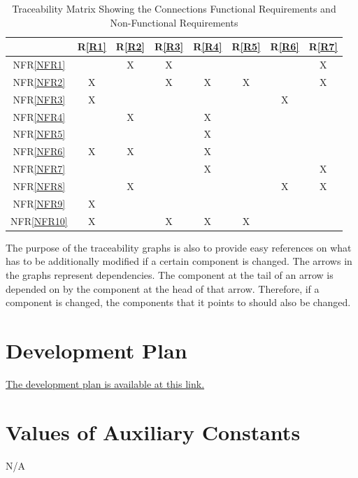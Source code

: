 \documentclass[12pt]{article}
\newcommand{\frref}[1]{R\ref{#1}}
\newcommand{\nfrref}[1]{NFR\ref{#1}}
\begin{document}
\begin{table}[H]
	\centering
	\caption{Traceability Matrix Showing the Connections Functional Requirements and Non-Functional Requirements}
	\begin{tabular}{|c|c|c|c|c|c|c|c|}
	\hline
		& \frref{R1}& \frref{R2}& \frref{R3}& \frref{R4}& \frref{R5}& \frref{R6}& \frref{R7} \\
	\hline                    %
	\nfrref{NFR1}         &   & X& X&   &   &   & X\\ \hline
	\nfrref{NFR2}         & X&   & X& X&  X&   & X\\ \hline
	\nfrref{NFR3}         & X&   &   &   &   & X&   \\ \hline
	\nfrref{NFR4}         &   & X&   & X&   &   &   \\ \hline
	\nfrref{NFR5}         &   &   &   &  X &   &   &   \\ \hline
	\nfrref{NFR6}         &  X &  X &   &  X &   &   &   \\ \hline
	\nfrref{NFR7}         &   &   &   & X  &   &   &X   \\ \hline
	\nfrref{NFR8}         &   &   X&   &   &   & X  &X   \\ \hline
	\nfrref{NFR9}         &   X&   &   &   &   &   &   \\ \hline 
	\nfrref{NFR10}       &  X &   & X  & X  & X  &   &   \\ 
	\hline
	\end{tabular}
	\label{Table:R_trace}
\end{table}

The purpose of the traceability graphs is also to provide easy references on
what has to be additionally modified if a certain component is changed.  The
arrows in the graphs represent dependencies. The component at the tail of an
arrow is depended on by the component at the head of that arrow. Therefore, if a
component is changed, the components that it points to should also be
changed.\\

\section{Development Plan}
\label{Dev_Plan}

\href{https://github.com/zakerl/Capstone_Project/blob/main/docs/DevelopmentPlan/DevelopmentPlan.pdf}{The development plan is available at this link.}

\section{Values of Auxiliary Constants}
\label{VAC}
N/A
\end{document}
